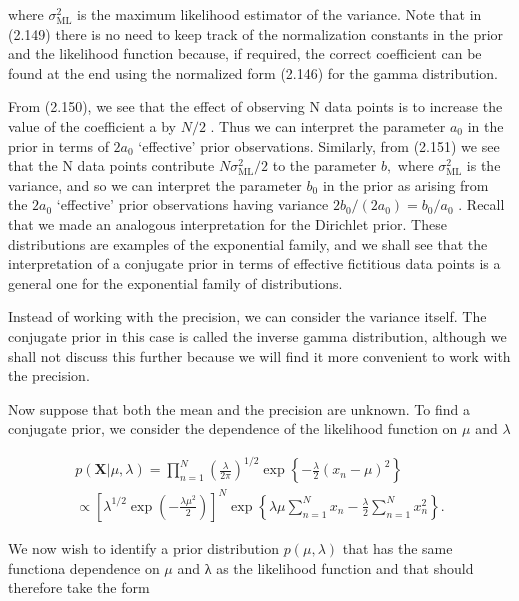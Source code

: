 \documentclass[
  10
]{article}
\begin{document}
where \(\sigma _ { \mathrm { M L } } ^ { 2 }\) is the maximum likelihood
estimator of the variance. Note that in (2.149) there is no need to keep
track of the normalization constants in the prior and the likelihood
function because, if required, the correct coefficient can be found at
the end using the normalized form (2.146) for the gamma distribution.

From (2.150), we see that the effect of observing N data points is to
increase the value of the coefficient a by \(N / 2\) . Thus we can
interpret the parameter \(a _ { 0 }\) in the prior in terms of
\(2 a _ { 0 }\) `effective' prior observations. Similarly, from (2.151)
we see that the N data points contribute
\({ N \sigma _ { \mathrm { { M L } } } ^ { 2 } } / 2\) to the parameter
\(b ,\) where \(\sigma _ { \mathrm { M L } } ^ { 2 }\) is the variance,
and so we can interpret the parameter \(b _ { 0 }\) in the prior as
arising from the \(2 a _ { 0 }\) `effective' prior observations having
variance \(2 b _ { 0 } / ( 2 a _ { 0 } ) = b _ { 0 } / a _ { 0 }\) .
Recall that we made an analogous interpretation for the Dirichlet prior.
These distributions are examples of the exponential family, and we shall
see that the interpretation of a conjugate prior in terms of effective
fictitious data points is a general one for the exponential family of
distributions.

Instead of working with the precision, we can consider the variance
itself. The conjugate prior in this case is called the inverse gamma
distribution, although we shall not discuss this further because we will
find it more convenient to work with the precision.

Now suppose that both the mean and the precision are unknown. To find a
conjugate prior, we consider the dependence of the likelihood function
on \(\mu\) and \(\lambda\)

\[
\begin{array}{l} p (\mathbf {X} | \mu , \lambda) = \prod_ {n = 1} ^ {N} \left(\frac {\lambda}{2 \pi}\right) ^ {1 / 2} \exp \left\{- \frac {\lambda}{2} (x _ {n} - \mu) ^ {2} \right\} \\ \propto \left[ \lambda^ {1 / 2} \exp \left(- \frac {\lambda \mu^ {2}}{2}\right) \right] ^ {N} \exp \left\{\lambda \mu \sum_ {n = 1} ^ {N} x _ {n} - \frac {\lambda}{2} \sum_ {n = 1} ^ {N} x _ {n} ^ {2} \right\}. \end{array}\tag{2.152}
\]

We now wish to identify a prior distribution \(p ( \mu , \lambda )\)
that has the same functiona dependence on \(\mu\) and λ as the
likelihood function and that should therefore take the form
\end{document}
